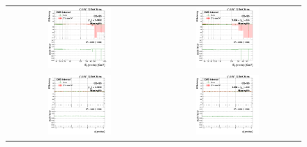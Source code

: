 \begin{figure}[bh]
  \begin{center}
    \begin{tabular}{cc}
      \includegraphics[width=0.45\textwidth]{figures/Zprime/2017/ScaleFactor/SameSign/N-1/g_compare_cut_Et_Barrel_ea_ta_inc_AS_N_1_MissHit_PUW.png} &
      \includegraphics[width=0.45\textwidth]{figures/Zprime/2017/ScaleFactor/SameSign/N-1/g_compare_cut_Et_Endcap_ea_ta_inc_AS_N_1_MissHit_PUW.png} \\
      \includegraphics[width=0.45\textwidth]{figures/Zprime/2017/ScaleFactor/SameSign/N-1/g_compare_cut_phi_Barrel_ea_ta_inc_AS_N_1_MissHit_PUW.png} &
      \includegraphics[width=0.45\textwidth]{figures/Zprime/2017/ScaleFactor/SameSign/N-1/g_compare_cut_phi_Endcap_ea_ta_inc_AS_N_1_MissHit_PUW.png} \\

\end{tabular}
\end{center}
\end{figure}
